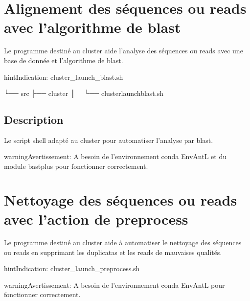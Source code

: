 \documentclass[letterpaper,10pt,french]{sphinxmanual}
\begin{document}
\section{Alignement des séquences ou reads avec l’algorithme de blast}
\label{\detokenize{cluster/cluster_launch_blast.sh:alignement-des-sequences-ou-reads-avec-l-algorithme-de-blast}}\label{\detokenize{cluster/cluster_launch_blast.sh::doc}}
Le programme destiné au cluster aide l’analyse des séquences ou reads avec une base de donnée et l’algorithme de blast.

\begin{sphinxadmonition}{hint}{Indication:}
cluster\_launch\_blast.sh
\end{sphinxadmonition}

\begin{sphinxVerbatim}[commandchars=\\\{\}]
└── src
 ├── cluster
 │   └── cluster\PYGZus{}launch\PYGZus{}blast.sh
\end{sphinxVerbatim}


\subsection{Description}
\label{\detokenize{cluster/cluster_launch_blast.sh:description}}
Le script shell adapté au cluster pour automatiser l’analyse par blast.

\begin{sphinxadmonition}{warning}{Avertissement:}
A besoin de l’environnement conda EnvAntL et du module bastplus pour fonctionner correctement.
\end{sphinxadmonition}


\section{Nettoyage des séquences ou reads avec l’action de preprocess}
\label{\detokenize{cluster/cluster_launch_preprocess.sh:nettoyage-des-sequences-ou-reads-avec-l-action-de-preprocess}}\label{\detokenize{cluster/cluster_launch_preprocess.sh::doc}}
Le programme destiné au cluster aide à automatiser le nettoyage des séquences ou reads en supprimant les duplicatas et les reads de mauvaises qualités.

\begin{sphinxadmonition}{hint}{Indication:}
cluster\_launch\_preprocess.sh
\end{sphinxadmonition}

\begin{sphinxadmonition}{warning}{Avertissement:}
A besoin de l’environnement conda EnvAntL pour fonctionner correctement.
\end{sphinxadmonition}
\end{document}
